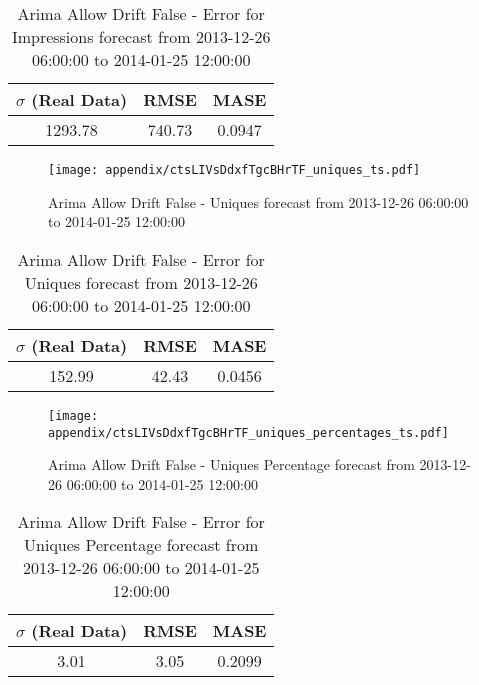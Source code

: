 \begin{table}[H]
\centering
\footnotesize
\begin{tabular}{ccc}
$\sigma$ (Real Data) & RMSE & MASE   \\ \hline
1293.78 & 740.73 & 0.0947 \\
\end{tabular}

\vspace{0.5cm}

\caption{
Arima Allow Drift False - Error for Impressions forecast from 2013-12-26 06:00:00 to 2014-01-25 12:00:00}
\end{table}

\begin{figure}[H] \begin{center} \leavevmode
\texttt{[image: appendix/ctsLIVsDdxfTgcBHrTF\_uniques\_ts.pdf]} \caption{
Arima Allow Drift False - Uniques forecast from 2013-12-26 06:00:00 to 2014-01-25 12:00:00} \label{fig:appendix/ctsLIVsDdxfTgcBHrTF_uniques_ts.pdf} \end{center}
\end{figure}

\begin{table}[H]
\centering
\footnotesize
\begin{tabular}{ccc}
$\sigma$ (Real Data) & RMSE & MASE   \\ \hline
152.99 & 42.43 & 0.0456 \\
\end{tabular}

\vspace{0.5cm}

\caption{
Arima Allow Drift False - Error for Uniques forecast from 2013-12-26 06:00:00 to 2014-01-25 12:00:00}
\end{table}

\begin{figure}[H] \begin{center} \leavevmode
\texttt{[image: appendix/ctsLIVsDdxfTgcBHrTF\_uniques\_percentages\_ts.pdf]} \caption{
Arima Allow Drift False - Uniques Percentage forecast from 2013-12-26 06:00:00 to 2014-01-25 12:00:00} \label{fig:appendix/ctsLIVsDdxfTgcBHrTF_uniques_percentages_ts.pdf} \end{center}
\end{figure}

\begin{table}[H]
\centering
\footnotesize
\begin{tabular}{ccc}
$\sigma$ (Real Data) & RMSE & MASE   \\ \hline
3.01 & 3.05 & 0.2099 \\
\end{tabular}

\vspace{0.5cm}

\caption{
Arima Allow Drift False - Error for Uniques Percentage forecast from 2013-12-26 06:00:00 to 2014-01-25 12:00:00}
\end{table}

